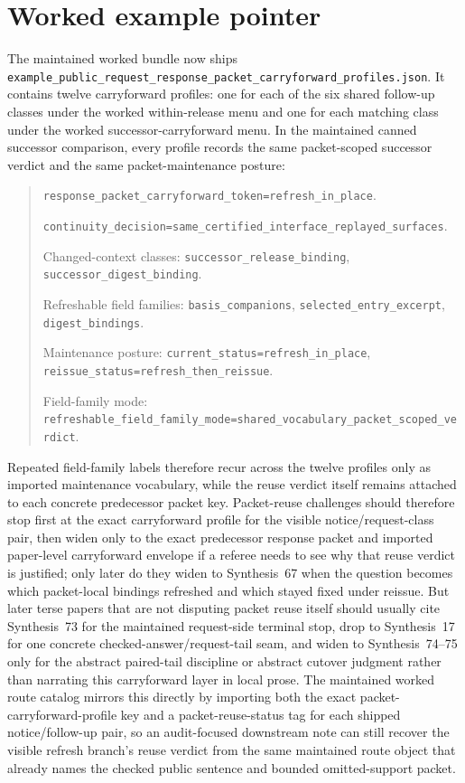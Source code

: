 \documentclass[11pt]{article}
\begin{document}
\section{Worked example pointer}
The maintained worked bundle now ships \nolinkurl{example_public_request_response_packet_carryforward_profiles.json}.\cite{series:workedexample}
It contains twelve carryforward profiles: one for each of the six shared follow-up classes under the worked within-release menu and one for each matching class under the worked successor-carryforward menu.
In the maintained canned successor comparison, every profile records the same packet-scoped successor verdict and the same packet-maintenance posture:
\begin{quote}\small
\nolinkurl{response_packet_carryforward_token=refresh_in_place}.\par
\nolinkurl{continuity_decision=same_certified_interface_replayed_surfaces}.\par
Changed-context classes: \nolinkurl{successor_release_binding}, \nolinkurl{successor_digest_binding}.\par
Refreshable field families: \nolinkurl{basis_companions}, \nolinkurl{selected_entry_excerpt}, \nolinkurl{digest_bindings}.\par
Maintenance posture: \nolinkurl{current_status=refresh_in_place}, \nolinkurl{reissue_status=refresh_then_reissue}.\par
Field-family mode: \nolinkurl{refreshable_field_family_mode=shared_vocabulary_packet_scoped_verdict}.
\end{quote}
Repeated field-family labels therefore recur across the twelve profiles only as imported maintenance vocabulary, while the reuse verdict itself remains attached to each concrete predecessor packet key.
Packet-reuse challenges should therefore stop first at the exact carryforward profile for the visible notice/request-class pair, then widen only to the exact predecessor response packet and imported paper-level carryforward envelope if a referee needs to see why that reuse verdict is justified; only later do they widen to Synthesis~67 when the question becomes which packet-local bindings refreshed and which stayed fixed under reissue.\cite{series:publicrequestresponsepacketdeltas}
But later terse papers that are not disputing packet reuse itself should usually cite Synthesis~73 for the maintained request-side terminal stop, drop to Synthesis~17 for one concrete checked-answer/request-tail seam, and widen to Synthesis~74--75 only for the abstract paired-tail discipline or abstract cutover judgment rather than narrating this carryforward layer in local prose. The maintained worked route catalog mirrors this directly by importing both the exact packet-carryforward-profile key and a packet-reuse-status tag for each shipped notice/follow-up pair, so an audit-focused downstream note can still recover the visible refresh branch's reuse verdict from the same maintained route object that already names the checked public sentence and bounded omitted-support packet.
\end{document}
